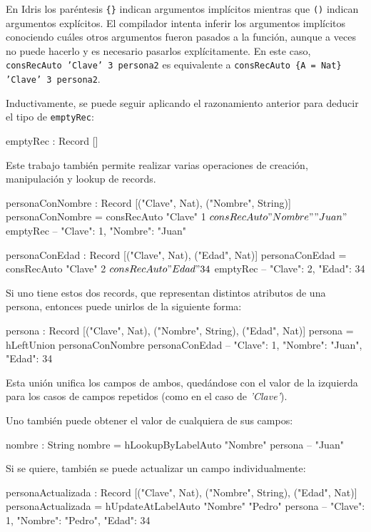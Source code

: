 En Idris los paréntesis \texttt{\{\}} indican argumentos implícitos mientras que \texttt{()} indican argumentos explícitos. El compilador intenta inferir los argumentos implícitos conociendo cuáles otros argumentos fueron pasados a la función, aunque a veces no puede hacerlo y es necesario pasarlos explícitamente. En este caso, \texttt{consRecAuto 'Clave' 3 persona2} es equivalente a \texttt{consRecAuto \{A = Nat\} 'Clave' 3 persona2}.

Inductivamente, se puede seguir aplicando el razonamiento anterior para deducir el tipo de \texttt{emptyRec}:

\begin{code}
emptyRec : Record []
\end{code}

Este trabajo también permite realizar varias operaciones de creación, manipulación y lookup de records.

\begin{code}
personaConNombre : Record [("Clave", Nat), ("Nombre", String)]
personaConNombre = consRecAuto "Clave" 1 $
  consRecAuto "Nombre" "Juan" $
  emptyRec
-- { "Clave": 1, "Nombre": "Juan" }

personaConEdad : Record [("Clave", Nat), ("Edad", Nat)]
personaConEdad = consRecAuto "Clave" 2 $
  consRecAuto "Edad" 34 $
  emptyRec
-- { "Clave": 2, "Edad": 34 }
\end{code}

Si uno tiene estos dos records, que representan distintos atributos de una persona, entonces puede unirlos de la siguiente forma:

\begin{code}
persona : Record [("Clave", Nat), ("Nombre", String),
  ("Edad", Nat)]
persona = hLeftUnion personaConNombre personaConEdad
-- { "Clave": 1, "Nombre": "Juan", "Edad": 34 }
\end{code}

Esta unión unifica los campos de ambos, quedándose con el valor de la izquierda para los casos de campos repetidos (como en el caso de \textit{'Clave'}).

Uno también puede obtener el valor de cualquiera de sus campos:

\begin{code}
nombre : String
nombre = hLookupByLabelAuto "Nombre" persona
-- "Juan"
\end{code}

Si se quiere, también se puede actualizar un campo individualmente:

\begin{code}
personaActualizada : Record [("Clave", Nat), ("Nombre", String),
  ("Edad", Nat)]
personaActualizada = hUpdateAtLabelAuto "Nombre" "Pedro" persona
-- { "Clave": 1, "Nombre": "Pedro", "Edad": 34 }
\end{code}


